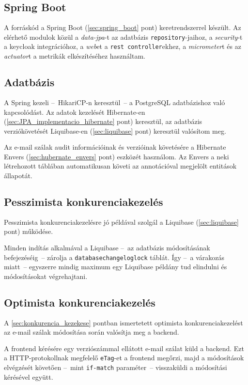 \subsection{Spring Boot}
A forráskód a Spring Boot (\ref{sec:spring_boot} pont) keretrendszerrel készült. Az elérhető modulok közül a \emph{data-jpa}-t az adatbázis \texttt{repository}-jaihoz, a \emph{security}-t a keycloak integrációhoz, a \emph{web}et a \texttt{rest controller}ekhez, a \emph{micrometer}t és az \emph{actuator}t a metrikák elkészítéséhez használtam.	


\subsection{Adatbázis}\label{sec:adatbazis}
A Spring kezeli --~HikariCP-n keresztül~--   a PostgreSQL adatbázishoz való kapcsolódást.
Az adatok kezelését Hibernate-en (\ref{sec:JPA_implementacio_hibernate} pont) keresztül, az adatbázis verziókövetését Liquibase-en (\ref{sec:liquibase} pont) keresztül valósítom meg. 

Az e-mail szálak audit információinak és verzióinak követésére a Hibernate Envers (\ref{sec:hubernate_envers} pont) eszközét használom. Az Envers a neki létrehozott táblában automatikusan követi az annotációval megjelölt entitások állapotát.

\subsection{Pesszimista konkurenciakezelés}
Pesszimista konkurenciakezelésre jó példával szolgál a Liquibase (\ref{sec:liquibase} pont) működése. 

Minden indítás alkalmával a Liquibase --~az adatbázis módosításának befejezéséig~--   zárolja a \texttt{databasechangeloglock} táblát. Így --~a várakozás miatt~-- egyszerre mindig maximum egy Liquibase példány tud elindulni és módosításokat végrehajtani.


\subsection{Optimista konkurenciakezelés}
A \ref{sec:konkurencia_kezekese} pontban ismertetett optimista konkurenciakezelést az e-mail szálak módosítása során valósítja meg a backend.

A frontend kérésére egy verziószámmal ellátott e-mail szálat küld a backend. Ezt a HTTP-protokollnak megfelelő \texttt{eTag}-et a frontend megőrzi, majd a módosítások elvégzését követően --~mint \texttt{if-match} paraméter~-- visszaküldi a módosítási kérésével együtt.

